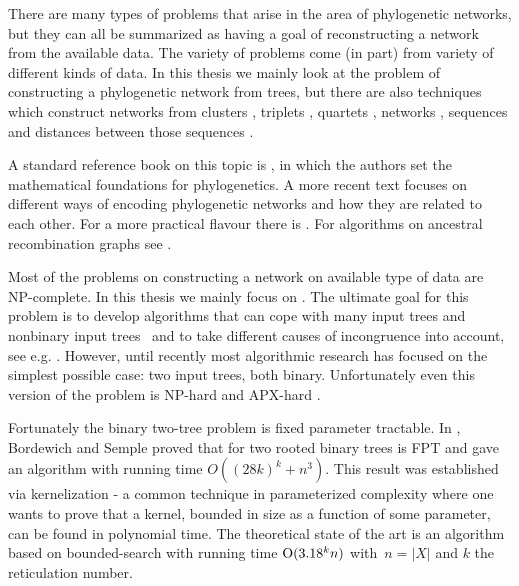

There are many types of problems that arise in the area of phylogenetic networks, but they can all be summarized as having a goal of reconstructing a network from the available data. The variety of problems come (in part) from variety of different kinds of data. In this thesis we mainly look at the problem of constructing a phylogenetic network from trees, but there are also techniques which construct networks from clusters \cite{KelkScornavacca2011, elusiveness}, triplets \cite{kelklev2, simptrip}, quartets \cite{YGXW2014, GBP2012}, networks \cite{IerselMoulton2014, HuberMoulton2013, HIMW2014, 2014arXiv1411.6804H}, sequences \cite{jin2006maximum, JNST2007b, JNST2006a, ParkNakhleh2012b, FischerIKS15} and distances between those sequences \cite{francis2015tree, Willson2013}.



A standard reference book on this topic is \cite{SemSte03}, in which the authors set the mathematical foundations for phylogenetics. A more recent text \cite{DreHub12} focuses on different ways of encoding phylogenetic networks and how they are related to each other. For a more practical flavour there is \cite{HRS2011}. For algorithms on ancestral recombination graphs see \cite{Gusfield2014}.








Most of the problems on constructing a network on available type of data are NP-complete. In this thesis we mainly focus on \mh. The ultimate goal for this problem is to develop algorithms that can cope with many input trees and nonbinary input trees~\cite{davidbook} and to take different causes of incongruence into account, see e.g. \cite{yu2013parsimonious}.  However, until recently most algorithmic research has focused on the simplest possible case: two input trees, both binary. Unfortunately even this version of the problem is NP-hard and APX-hard \cite{bordewich07a}.


Fortunately the binary two-tree problem is fixed parameter tractable. In \cite{bordewich07b}, Bordewich and Semple proved that \mh for two rooted binary trees is FPT and gave an algorithm with running time $O((28k)^k + n^3)$. This result was established via kernelization - a common technique in parameterized complexity where one wants to prove that a kernel, bounded in size as a function of some parameter, can be found in polynomial time. The theoretical state of the art is an algorithm based on bounded-search with running time $\mathrm{O}(3.18^k n)$ \cite{whidden2013fixed} with~$n=|X|$ and $k$ the reticulation number. 

